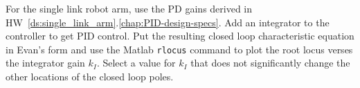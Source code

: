 For the single link robot arm, use the PD gains derived in HW~\ref{ds:single_link_arm}.\ref{chap:PID-design-specs}. 
Add an integrator to the controller to get PID control.  
Put the resulting closed loop characteristic equation in Evan's form and use the Matlab {\tt rlocus} command to plot the root locus verses the integrator gain $k_I$.  Select a value for $k_I$ that does not significantly change the other locations of the closed loop poles.  

